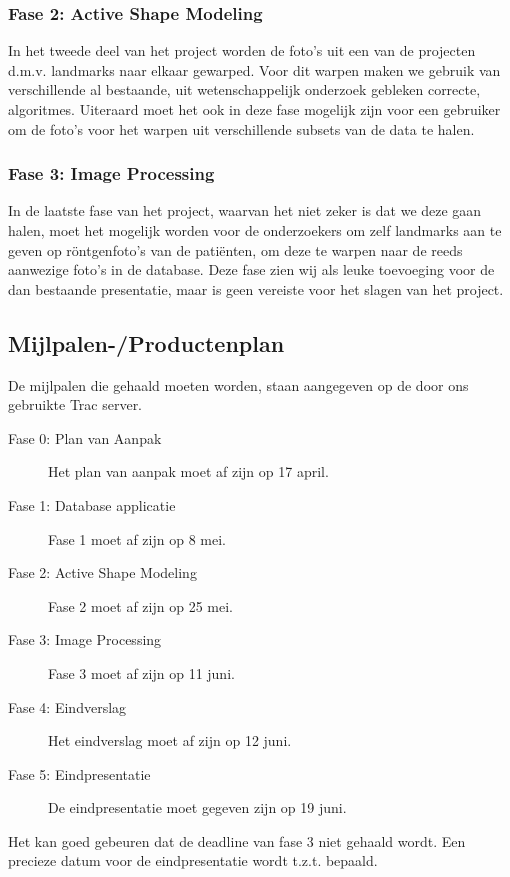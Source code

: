 \subsubsection{Fase 2: Active Shape Modeling}
In het tweede deel van het project worden de foto's uit een van de projecten d.m.v. landmarks naar elkaar gewarped. 
Voor dit warpen maken we gebruik van verschillende al bestaande, uit wetenschappelijk onderzoek gebleken correcte, algoritmes.
Uiteraard moet het ook in deze fase mogelijk zijn voor een gebruiker om de foto's voor het warpen uit verschillende subsets van de data te halen.

\subsubsection{Fase 3: Image Processing}
In de laatste fase van het project, waarvan het niet zeker is dat we deze gaan halen, moet het mogelijk worden voor de onderzoekers om zelf landmarks aan te geven op r\"ontgenfoto's van de pati\"enten, om deze te warpen naar de reeds aanwezige foto's in de database. Deze fase zien wij als leuke toevoeging voor de dan bestaande presentatie, maar is geen vereiste voor het slagen van het project.

\subsection{Mijlpalen-/Productenplan}
De mijlpalen die gehaald moeten worden, staan aangegeven op de door ons gebruikte Trac server.
\begin{description}
	\item[Fase 0: Plan van Aanpak] Het plan van aanpak moet af zijn op 17 april.
	\item[Fase 1: Database applicatie] Fase 1 moet af zijn op 8 mei.
	\item[Fase 2: Active Shape Modeling] Fase 2 moet af zijn op 25 mei.
	\item[Fase 3: Image Processing] Fase 3 moet af zijn op 11 juni.
	\item[Fase 4: Eindverslag] Het eindverslag moet af zijn op 12 juni.
	\item[Fase 5: Eindpresentatie] De eindpresentatie moet gegeven zijn op 19 juni.
\end{description}
Het kan goed gebeuren dat de deadline van fase 3 niet gehaald wordt.
Een precieze datum voor de eindpresentatie wordt t.z.t. bepaald.

